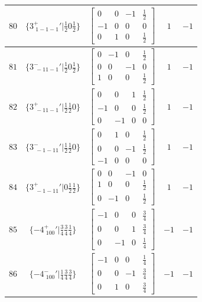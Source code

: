 \documentclass[fleqn,8pt]{jsarticle}
\begin{document}
\begin{longtable}{ccccc}
$ 80 $ & $ \{3^{+}_{\,\,1-1-1}{}'|\frac{1}{2} 0 \frac{1}{2}\} $ & $ \begin{bmatrix} 0 & 0 & -1 & \frac{1}{2} \\ -1 & 0 & 0 & 0 \\ 0 & 1 & 0 & \frac{1}{2} \end{bmatrix} $ & $ 1 $ & $ -1 $ \\ \hline
$ 81 $ & $ \{3^{-}_{\,\,-11-1}{}'|\frac{1}{2} 0 \frac{1}{2}\} $ & $ \begin{bmatrix} 0 & -1 & 0 & \frac{1}{2} \\ 0 & 0 & -1 & 0 \\ 1 & 0 & 0 & \frac{1}{2} \end{bmatrix} $ & $ 1 $ & $ -1 $ \\ \hline
$ 82 $ & $ \{3^{+}_{\,\,-11-1}{}'|\frac{1}{2} \frac{1}{2} 0\} $ & $ \begin{bmatrix} 0 & 0 & 1 & \frac{1}{2} \\ -1 & 0 & 0 & \frac{1}{2} \\ 0 & -1 & 0 & 0 \end{bmatrix} $ & $ 1 $ & $ -1 $ \\ \hline
$ 83 $ & $ \{3^{-}_{\,\,-1-11}{}'|\frac{1}{2} \frac{1}{2} 0\} $ & $ \begin{bmatrix} 0 & 1 & 0 & \frac{1}{2} \\ 0 & 0 & -1 & \frac{1}{2} \\ -1 & 0 & 0 & 0 \end{bmatrix} $ & $ 1 $ & $ -1 $ \\ \hline
$ 84 $ & $ \{3^{+}_{\,\,-1-11}{}'|0 \frac{1}{2} \frac{1}{2}\} $ & $ \begin{bmatrix} 0 & 0 & -1 & 0 \\ 1 & 0 & 0 & \frac{1}{2} \\ 0 & -1 & 0 & \frac{1}{2} \end{bmatrix} $ & $ 1 $ & $ -1 $ \\ \hline
$ 85 $ & $ \{-4^{+}_{\,\,100}{}'|\frac{3}{4} \frac{3}{4} \frac{1}{4}\} $ & $ \begin{bmatrix} -1 & 0 & 0 & \frac{3}{4} \\ 0 & 0 & 1 & \frac{3}{4} \\ 0 & -1 & 0 & \frac{1}{4} \end{bmatrix} $ & $ -1 $ & $ -1 $ \\ \hline
$ 86 $ & $ \{-4^{-}_{\,\,100}{}'|\frac{1}{4} \frac{3}{4} \frac{3}{4}\} $ & $ \begin{bmatrix} -1 & 0 & 0 & \frac{1}{4} \\ 0 & 0 & -1 & \frac{3}{4} \\ 0 & 1 & 0 & \frac{3}{4} \end{bmatrix} $ & $ -1 $ & $ -1 $ \\ \hline

\end{longtable}
\end{document}
